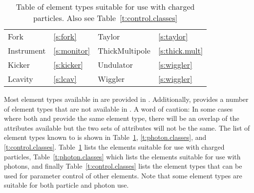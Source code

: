 \begin{table}[htb]
{\begin{tabular}{llll}
  Fork             & \ref{s:fork}          &  Taylor            & \ref{s:taylor}      \\
  Instrument       & \ref{s:monitor}       &  ThickMultipole    & \ref{s:thick.mult}  \\
  Kicker           & \ref{s:kicker}        &  Undulator         & \ref{s:wiggler}     \\
  Lcavity          & \ref{s:lcav}          &  Wiggler           & \ref{s:wiggler}     \\
  \bottomrule
\end{tabular}
} \caption{Table of element types suitable for use with charged particles. Also see
Table~\ref{t:control.classes}} \label{t:particle.classes}
\end{table}

Most element types available in \mad are provided in \bmad.  Additionally, \bmad provides a number
of element types that are not available in \mad.  A word of caution: In some cases where both \mad
and \bmad provide the same element type, there will be an overlap of the attributes available but
the two sets of attributes will not be the same.  The list of element types known to \bmad is shown
in Table~\ref{t:particle.classes}, \ref{t:photon.classes}, and \ref{t:control.classes}.
Table~\ref{t:particle.classes} lists the elements suitable for use with charged particles,
Table~\ref{t:photon.classes} which lists the elements suitable for use with photons, and finally
Table~\ref{t:control.classes} lists the  element types that can be used for parameter
control of other elements. Note that some element types are suitable for both particle and photon
use.

